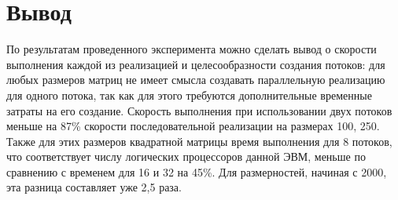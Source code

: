 \section{Вывод}
По результатам проведенного эксперимента можно сделать вывод о скорости выполнения каждой из реализацией и целесообразности создания потоков: для любых размеров матриц не имеет смысла создавать параллельную реализацию для одного потока, так как для этого требуются дополнительные временные затраты на его создание. Скорость выполнения при использовании двух потоков меньше на 87\% скорости последовательной реализации на размерах 100, 250. Также для этих размеров квадратной матрицы время выполнения для 8 потоков, что соответствует числу логических процессоров данной ЭВМ, меньше по сравнению с временем для 16 и 32 на 45\%. Для размерностей, начиная с 2000, эта разница составляет уже 2,5 раза.